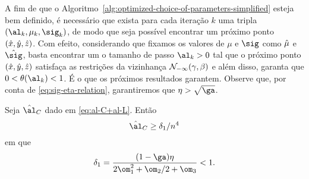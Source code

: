 A fim de que o Algoritmo~\ref{alg:optimized-choice-of-parameters-simplified} esteja bem definido, é necessário que exista para cada iteração $k$ uma tripla $(\al_k,\mu_k,\sig_k)$, de modo que seja possível encontrar um próximo ponto $(\hat{x},\hat{y},\hat{z})$. Com efeito, considerando que fixamos os valores de $\mu$ e $\sig$ como $\hat{\mu} $ e  $\nextsig$, basta encontrar um o tamanho de passo ${\al_k}>0$ tal que o próximo ponto $(\hat{x},\hat{y},\hat{z})$ satisfaça as restrições da vizinhança 
$\mathcal{N}_{-\infty}(\gamma,\beta)$ e além disso, garanta que  $0 < \theta(\al_k) <1$. É o que os próximos resultados garantem. Observe que, por conta de \eqref{eq:sig-eta-relation}, garantiremos que $\eta>\sqrt{\ga}$.



\begin{lema}\label{lemma:alC_delta-1}
Seja $\nextal_{C}$ dado em \eqref{eq:al-C+al-L}. Então 
\[
\nextal_{C} \geq \delta_{1}/n^{4}
\]
em que 
\[
\delta_{1} = \dfrac{(1-\ga)\eta}{2\om_{1}^{2} + \om_{2}/2 + \om_{3}  } < 1.
\]
\end{lema}

